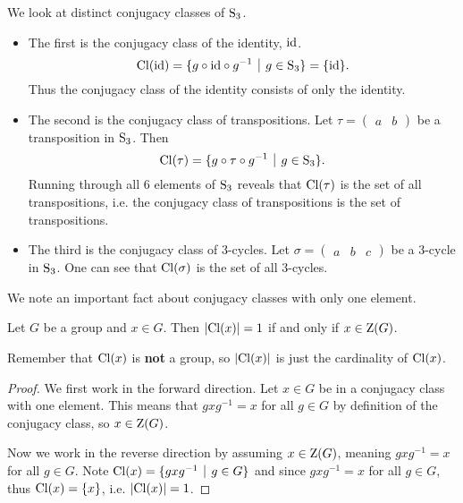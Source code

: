 \begin{example}\label{example-conjugacy-classes-of-Sn3}
    We look at distinct conjugacy classes of $\mathrm{S}_{3}$.
    \begin{itemize}
        \item The first is the conjugacy class of the identity, $\mathrm{id}$.
        \[
            \Cl{\id} = \{g\circ\id\circ g^{-1} \vert g \in \Sn{3} \} = \{\id\}.
        \]
        Thus the conjugacy class of the identity consists of only the identity.
        \item The second is the conjugacy class of transpositions. Let $\tau = \begin{pmatrix}a & b\end{pmatrix}$ be a transposition in $\mathrm{S}_{3}$. Then
        \[
            \Cl{\tau} = \{g\circ\tau\circ g^{-1} \vert g \in \Sn{3}\}.
        \]
        Running through all 6 elements of $\mathrm{S}_{3}$ reveals that $\mathrm{Cl}(\tau)$ is the set of all transpositions, i.e. the conjugacy class of transpositions is the set of transpositions.
        \item The third is the conjugacy class of 3-cycles. Let $\sigma = \begin{pmatrix}a & b & c\end{pmatrix}$ be a 3-cycle in $\mathrm{S}_{3}$. One can see that $\mathrm{Cl}(\sigma)$ is the set of all 3-cycles.
    \end{itemize}
\end{example}

We note an important fact about conjugacy classes with only one element.
\begin{proposition}\label{prop-element-with-singleton-conjugacy-class-in-center}
    Let $G$ be a group and $x \in G$. Then $|\mathrm{Cl}(x)| = 1$ if and only if $x \in \mathrm{Z}(G)$.
\end{proposition}
\begin{remark}
    Remember that $\mathrm{Cl}(x)$ is \textbf{not} a group, so $|\mathrm{Cl}(x)|$ is just the cardinality of $\mathrm{Cl}(x)$.
\end{remark}
\begin{proof}
    We first work in the forward direction. Let $x \in G$ be in a conjugacy class with one element. This means that $gxg^{-1} = x$ for all $g \in G$ by definition of the conjugacy class, so $x \in \mathrm{Z}(G)$.

    Now we work in the reverse direction by assuming $x \in \mathrm{Z}(G)$, meaning $gxg^{-1} = x$ for all $g \in G$. Note $\Cl{x} = \{gxg^{-1} \vert g \in G\}$ and since $gxg^{-1} = x$ for all $g \in G$, thus $\mathrm{Cl}(x) = \{x\}$, i.e. $|\mathrm{Cl}(x)| = 1$.
\end{proof}

